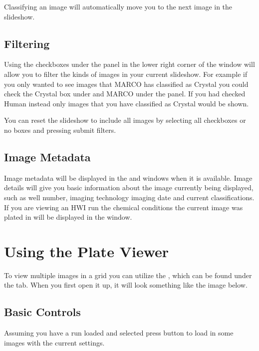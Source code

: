 \documentclass[letterpaper,10pt,english]{sphinxmanual}
\begin{document}
Classifying an image will automatically move you to the next image in
the slideshow.


\subsection{Filtering}
\label{\detokenize{user_guide:filtering}}
Using the checkboxes under the  panel in the lower
right corner of the window will allow you to filter the kinds of
images in your current slideshow. For example if you only wanted to
see images that MARCO has classified as Crystal you could check the Crystal box
under  and MARCO under the  panel. If you had checked Human
instead only images that you have classified as Crystal would be shown.

You can reset the slideshow to include all images by selecting all checkboxes
or no boxes and pressing submit filters.


\subsection{Image Metadata}
\label{\detokenize{user_guide:image-metadata}}
Image metadata will be displayed in the  and 
windows when it is available. Image details will give you basic information about
the image currently being displayed, such as well number, imaging technology
imaging date and current classifications. If you are viewing an HWI run
the chemical conditions the current image was plated in will be displayed in the
 window.


\section{Using the Plate Viewer}
\label{\detokenize{user_guide:using-the-plate-viewer}}
To view multiple images in a grid you can utilize the , which
can be found under the  tab. When you first open it up, it will
look something like the image below.
\begin{quote}

\noindent{}
\end{quote}


\subsection{Basic Controls}
\label{\detokenize{user_guide:basic-controls}}
Assuming you have a run loaded and selected press  button
to load in some images with the current settings.
\begin{quote}

\noindent{}
\end{quote}
\end{document}
